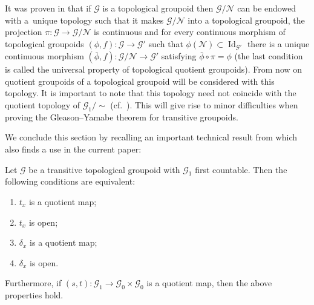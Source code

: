 It was proven in \cite{BH} that if $\mathcal{G}$ is a topological groupoid then $\mathcal{G}\slash\mathcal{N}$ can be endowed with a~unique topology such that it makes $\mathcal{G}\slash\mathcal{N}$ into a topological groupoid, the projection $\pi\colon \mathcal{G}\rightarrow\mathcal{G}\slash\mathcal{N}$ is continuous and for every continuous morphism of topological groupoids $(\phi,f)\colon \mathcal{G}\rightarrow\mathcal{G'}$ such that $\phi (\mathcal{N})\subset \operatorname{Id}_{\mathcal{G}'}$ there is a unique continuous morphism $(\overline{\phi},f)\colon \mathcal{G}\slash\mathcal{N}\rightarrow\mathcal{G}'$ satisfying $\overline{\phi}\circ\pi=\phi$ (the last condition is called the universal property of topological quotient groupoids). From now on quotient groupoids of a topological groupoid will be considered with this topology. It is important to note that this topology need not coincide with the quotient topology of $\mathcal{G}_1\slash\sim$ (cf.~\cite{McK1}). This will give rise to minor difficulties when proving the Gleason--Yamabe theorem for transitive groupoids.

We conclude this section by recalling an important technical result from \cite{H5oids} which also finds a use in the current paper:
\begin{prop}\label{eq} Let $\mathcal{G}$ be a transitive topological groupoid with $\mathcal{G}_1$ first countable. Then the following conditions are equivalent:
\begin{enumerate}\itemsep=0pt
\item[$1)$] $t_x$ is a quotient map;
\item[$2)$] $t_x$ is open;
\item[$3)$] $\delta_x$ is a quotient map;
\item[$4)$] $\delta_x$ is open.
\end{enumerate}
Furthermore, if $(s,t)\colon \mathcal{G}_1\rightarrow \mathcal{G}_0\times\mathcal{G}_0$ is a quotient map, then the above properties hold.
\end{prop}

